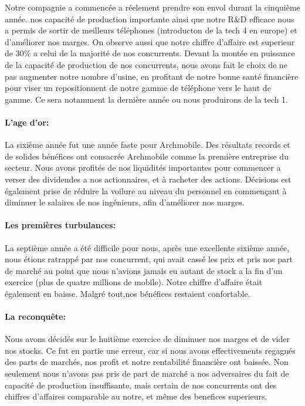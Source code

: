Notre compagnie a commencée a réelement prendre son envol durant la
cinquième année. nos capacité de production importante ainsi que notre
R\&D efficace nous a permis de sortir de meilleurs téléphones
(introducton de la tech 4 en europe) et d'améliorer nos marges. On
observe aussi que notre chiffre d'affaire est superieur de 30\% a
celui de la majorité de nos concurrents. Devant la montée en puissance
de la capacité de production de nos concurrents, nous avons fait le
choix de ne pas augmenter notre nombre d'usine, en profitant de notre
bonne santé financière pour viser un repositionnent de notre gamme de
téléphone vers le haut de gamme. Ce sera notamment la dernière année
ou nous produirons de la tech 1.

\paragraph{L'age d'or:}

La sixième année fut une année faste pour Archmobile. Des résultats
records et de solides bénéfices ont consacrée Archmobile comme la
première entreprise du secteur. Nous avons profités de nos liquidités
importantes pour commencer a verser des dividendes a nos actionnaires,
et à racheter des actions. Décisions est également prise de réduire la
voilure au niveau du personnel en commençant à diminuer le salaires de
nos ingénieurs, afin d'améliorer nos marges.

\paragraph{Les premières turbulances:}

La septième année a été difficile pour nous, après une excellente
sixième année, nous étions ratrappé par nos concurrent, qui avait
cassé les prix et pris nos part de marché au point que nous n'avions
jamais eu autant de stock a la fin d'un exercice (plus de quatre
millions de mobile). Notre chiffre d'affaire était également en baisse.
Malgré tout,nos bénéfices restaient confortable.

\paragraph{La reconquête:}
 
Nous avons décidés sur le huitième exercice de diminuer nos marges et
de vider nos stocks.  Ce fut en partie une erreur, car si nous avons
effectivements regagnés des parts de marchés, nos profit et notre
rentabilité financière ont baissée. Non seulement nous n'avons pas
pris de part de marché a nos adversaires du fait de capacité de
production insuffisante, mais certain de nos concurrents ont des chiffres d'affaires 
comparable au notre, et même des benefices superieurs. 

